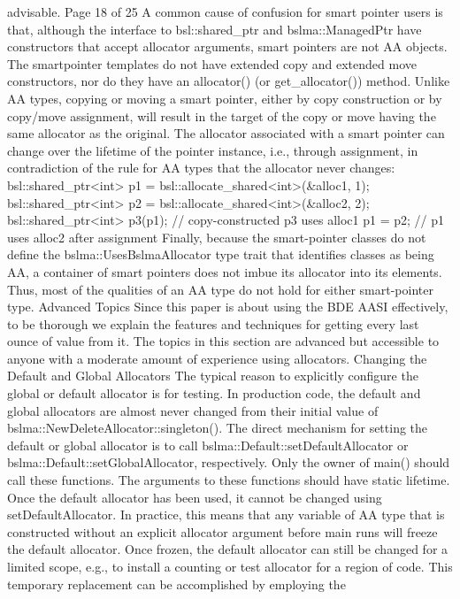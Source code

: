 advisable.
Page 18 of 25
A common cause of confusion for smart pointer users is that, although the
interface to bsl::shared_ptr and bslma::ManagedPtr have constructors that
accept allocator arguments, smart pointers are not AA objects. The smartpointer templates do not have extended copy and extended move constructors,
nor do they have an allocator() (or get_allocator()) method. Unlike AA
types, copying or moving a smart pointer, either by copy construction or by
copy/move assignment, will result in the target of the copy or move having the
same allocator as the original. The allocator associated with a smart pointer
can change over the lifetime of the pointer instance, i.e., through assignment,
in contradiction of the rule for AA types that the allocator never changes:
bsl::shared_ptr<int> p1 = bsl::allocate_shared<int>(&alloc1, 1);
bsl::shared_ptr<int> p2 = bsl::allocate_shared<int>(&alloc2, 2);
bsl::shared_ptr<int> p3(p1); // copy-constructed p3 uses alloc1
p1 = p2; // p1 uses alloc2 after assignment
Finally, because the smart-pointer classes do not define the
bslma::UsesBslmaAllocator type trait that identifies classes as being AA, a
container of smart pointers does not imbue its allocator into its elements.
Thus, most of the qualities of an AA type do not hold for either smart-pointer
type.
Advanced Topics
Since this paper is about using the BDE AASI effectively, to be thorough we
explain the features and techniques for getting every last ounce of value from
it. The topics in this section are advanced but accessible to anyone with a
moderate amount of experience using allocators.
Changing the Default and Global Allocators
The typical reason to explicitly configure the global or default allocator is for
testing. In production code, the default and global allocators are almost never
changed from their initial value of bslma::NewDeleteAllocator::singleton().
The direct mechanism for setting the default or global allocator is to call
bslma::Default::setDefaultAllocator or
bslma::Default::setGlobalAllocator, respectively. Only the owner of main()
should call these functions. The arguments to these functions should have
static lifetime. Once the default allocator has been used, it cannot be changed
using setDefaultAllocator. In practice, this means that any variable of AA
type that is constructed without an explicit allocator argument before main
runs will freeze the default allocator.
Once frozen, the default allocator can still be changed for a limited scope, e.g.,
to install a counting or test allocator for a region of code. This temporary
replacement can be accomplished by employing the 
